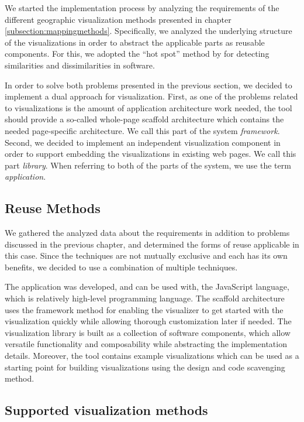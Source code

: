 We started the implementation process by analyzing the requirements of the different geographic visualization methods presented in chapter \ref{subsection:mappingmethods}. Specifically, we analyzed the underlying structure of the visualizations in order to abstract the applicable parts as reusable components. For this, we adopted the ``hot spot'' method by \citet{schmid_systematic_1997} for detecting similarities and dissimilarities in software.

In order to solve both problems presented in the previous section, we decided to implement a dual approach for visualization. First, as one of the problems related to visualizations is the amount of application architecture work needed, the tool should provide a so-called whole-page scaffold architecture \citep{jazayeri_trends_2007} which contains the needed page-specific architecture. We call this part of the system \emph{framework}. Second, we decided to implement an independent visualization component in order to support embedding the visualizations in existing web pages. We call this part \emph{library}. When referring to both of the parts of the system, we use the term \emph{application}.

\subsection{Reuse Methods}

We gathered the analyzed data about the requirements in addition to problems discussed in the previous chapter, and determined the forms of reuse applicable in this case. Since the techniques are not mutually exclusive and each has its own benefits, we decided to use a combination of multiple techniques. 

The application was developed, and can be used with, the JavaScript language, which is relatively high-level programming language. The scaffold architecture uses the framework method for enabling the visualizer to get started with the visualization quickly while allowing thorough customization later if needed. The visualization library is built as a collection of software components, which allow versatile functionality and composability while abstracting the implementation details. Moreover, the tool contains example visualizations which can be used as a starting point for building visualizations using the design and code scavenging method.


\subsection{Supported visualization methods}
\label{subsection:supportedvisualizationmethods}

